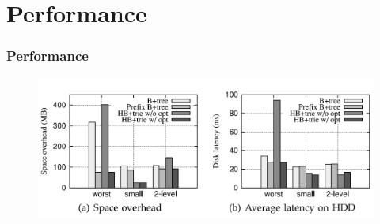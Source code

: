 \documentclass[aspectratio=169]{beamer}
\begin{document}
\section{Performance}
\begin{frame}[t]
    \frametitle{Performance}
    \begin{figure}[h!]
    	\includegraphics[scale=0.5]{comparision_bplus}
    \end{figure}
    \centering
\end{frame}
\end{document}

